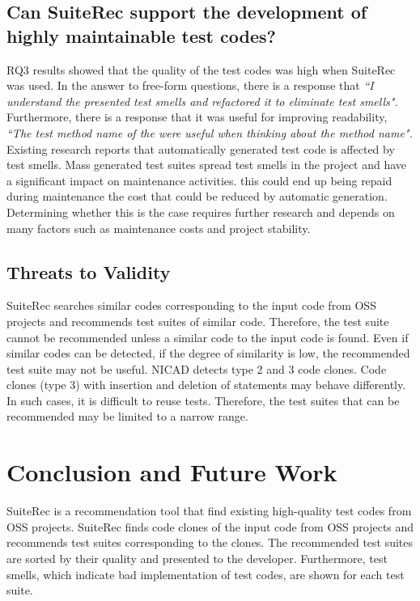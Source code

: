 \documentclass[conference]{IEEEtran}
\begin{document}
\subsection{Can SuiteRec support the development of highly maintainable test codes?}
RQ3 results showed that the quality of the test codes was high when SuiteRec was used. In the answer to free-form questions, there is a response that {\it ``I understand the presented test smells and refactored it to eliminate test smells".} Furthermore, there is a response that it was useful for improving readability, {\it ``The test method name of the  were useful when thinking about the method name".} Existing research reports that automatically generated test code is affected by test smells\cite{}. Mass generated test suites spread test smells in the project and have a significant impact on maintenance activities. this could end up being repaid during maintenance the cost that could be reduced by automatic generation. Determining whether this is the case requires further research and depends on many factors such as maintenance costs and project stability.

\subsection{Threats to Validity}
SuiteRec searches similar codes corresponding to the input code from OSS projects and recommends test suites of similar code. Therefore, the test suite cannot be recommended unless a similar code to the input code is found. Even if similar codes can be detected, if the degree of similarity is low, the recommended test suite may not be useful. NICAD detects type 2 and 3 code clones. Code clones (type 3) with insertion and deletion of statements may behave differently. In such cases, it is difficult to reuse tests. Therefore, the test suites that can be recommended may be limited to a narrow range.

\section{Conclusion and Future Work}
SuiteRec is a recommendation tool that find existing high-quality test codes from OSS projects. SuiteRec finds code clones of the input code from OSS projects and recommends test suites corresponding to the clones. The recommended test suites are sorted by their quality and presented to the developer. Furthermore, test smells, which indicate bad implementation of test codes, are shown for each test suite.
\end{document}
